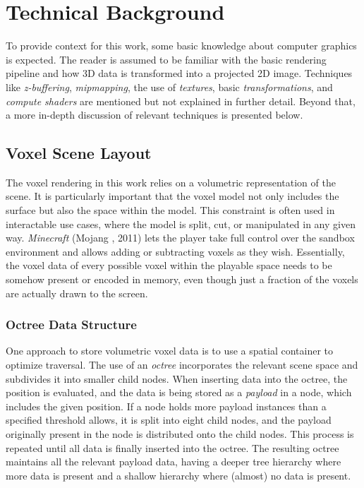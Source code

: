 \chapter{Technical Background} \label{cpt-technical-background}

To provide context for this work, some basic knowledge about computer graphics is expected.
The reader is assumed to be familiar with the basic rendering pipeline and how 3D data is 
transformed into a projected 2D image. Techniques like \emph{z-buffering}, \emph{mipmapping}, 
the use of \emph{textures}, basic \emph{transformations}, and \emph{compute shaders} are mentioned 
but not explained in further detail. Beyond that, a more in-depth discussion of relevant techniques 
is presented below.

\section{Voxel Scene Layout} \label{sec-voxel-scene-layout}

The voxel rendering in this work relies on a volumetric representation of the scene.
It is particularly important that the voxel model not only includes the surface but also 
the space within the model. This constraint is often used in interactable use cases, where 
the model is split, cut, or manipulated in any given way. \emph{Minecraft} (Mojang \cite{Mojang2024}, 
2011) lets the player take full control over the sandbox environment and allows adding or 
subtracting voxels as they wish. Essentially, the voxel data of every possible voxel within 
the playable space needs to be somehow present or encoded in memory, even though just a 
fraction of the voxels are actually drawn to the screen.


\subsection*{Octree Data Structure} \label{subsec-octree-data-structure}

One approach to store volumetric voxel data is to use a spatial container to optimize traversal. 
The use of an \emph{octree} incorporates the relevant scene space and subdivides it into smaller 
child nodes. When inserting data into the octree, the position is evaluated, and the data is 
being stored as a \emph{payload} in a node, which includes the given position. If a node holds 
more payload instances than a specified threshold allows, it is split into eight child nodes, 
and the payload originally present in the node is distributed onto the child nodes. This process 
is repeated until all data is finally inserted into the octree. The resulting octree maintains 
all the relevant payload data, having a deeper tree hierarchy where more data is present and a 
shallow hierarchy where (almost) no data is present.

